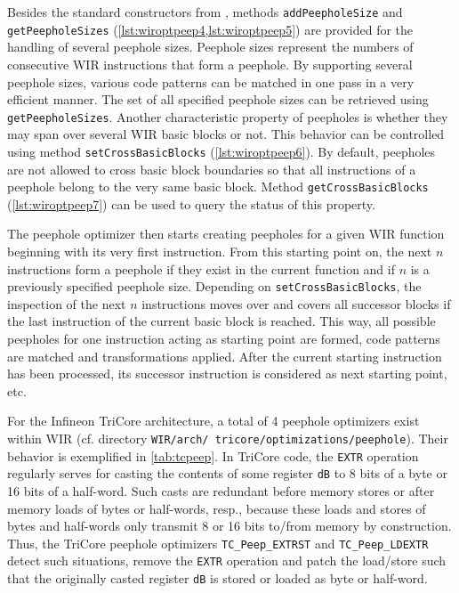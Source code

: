 Besides the standard constructors from , methods \texttt{addPeepholeSize} and \texttt{getPeepholeSizes} (\cref{lst:wiroptpeep4,lst:wiroptpeep5}) are provided for the handling of several peephole sizes.
Peephole sizes represent the numbers of consecutive \gls{WIR} instructions that form a peephole.
By supporting several peephole sizes, various code patterns can be matched in one pass in a very efficient manner.
The set of all specified peephole sizes can be retrieved using \texttt{getPeepholeSizes}.
Another characteristic property of peepholes is whether they may span over several \gls{WIR} basic blocks or not.
This behavior can be controlled using method \texttt{setCrossBasicBlocks} (\cref{lst:wiroptpeep6}).
By default, peepholes are not allowed to cross basic block boundaries so that all instructions of a peephole belong to the very same basic block.
Method \texttt{getCrossBasicBlocks} (\cref{lst:wiroptpeep7}) can be used to query the status of this property.

The peephole optimizer then starts creating peepholes for a given \gls{WIR} function beginning with its very first instruction.
From this starting point on, the next $n$ instructions form a peephole if they exist in the current function and if $n$ is a previously specified peephole size.
Depending on \texttt{setCrossBasicBlocks}, the inspection of the next $n$ instructions moves over and covers all successor blocks if the last instruction of the current basic block is reached.
This way, all possible peepholes for one instruction acting as starting point are formed, code patterns are matched and transformations applied.
After the current starting instruction has been processed, its successor instruction is considered as next starting point, etc.

For the Infineon TriCore architecture, a total of 4 peephole optimizers exist within \gls{WIR} (cf. directory \texttt{WIR/arch/ tricore/optimizations/peephole}).
Their behavior is exemplified in \cref{tab:tcpeep}.
In TriCore code, the \texttt{EXTR} operation regularly serves for casting the contents of some register \texttt{dB} to 8 bits of a byte or 16 bits of a half-word.
Such casts are redundant before memory stores or after memory loads of bytes or half-words, resp., because these loads and stores of bytes and half-words only transmit 8 or 16 bits to/from memory by construction.
Thus, the TriCore peephole optimizers \texttt{TC\_Peep\_EXTRST} and \texttt{TC\_Peep\_LDEXTR} detect such situations, remove the \texttt{EXTR} operation and patch the load/store such that the originally casted register \texttt{dB} is stored or loaded as byte or half-word.

